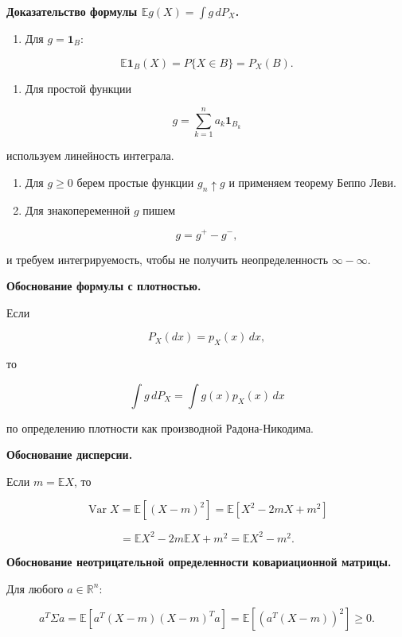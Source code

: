\documentclass[
  11pt,
  a4paper,
]{article}
\providecommand{\tightlist}{%
  \setlength{\itemsep}{0pt}\setlength{\parskip}{0pt}}
\begin{document}
\textbf{Доказательство формулы \(\mathbb E g(X)=\int g\,dP_X\).}

\begin{enumerate}
\def\labelenumi{\arabic{enumi}.}
\tightlist
\item
  Для \(g=\mathbf 1_B\):
\end{enumerate}

\[
\mathbb E\mathbf 1_B(X)=P\{X\in B\}=P_X(B).
\]

\begin{enumerate}
\def\labelenumi{\arabic{enumi}.}
\setcounter{enumi}{1}
\tightlist
\item
  Для простой функции
\end{enumerate}

\[
g=\sum_{k=1}^n a_k\mathbf 1_{B_k}
\]

используем линейность интеграла.

\begin{enumerate}
\def\labelenumi{\arabic{enumi}.}
\setcounter{enumi}{2}
\item
  Для \(g\ge0\) берем простые функции \(g_n\uparrow g\) и применяем
  теорему Беппо Леви.
\item
  Для знакопеременной \(g\) пишем
\end{enumerate}

\[
g=g^+-g^-,
\]

и требуем интегрируемость, чтобы не получить неопределенность
\(\infty-\infty\).

\textbf{Обоснование формулы с плотностью.}

Если

\[
P_X(dx)=p_X(x)\,dx,
\]

то

\[
\int g\,dP_X
=
\int g(x)p_X(x)\,dx
\]

по определению плотности как производной Радона-Никодима.

\textbf{Обоснование дисперсии.}

Если \(m=\mathbb EX\), то

\[
\operatorname{Var}X
=
\mathbb E[(X-m)^2]
=
\mathbb E[X^2-2mX+m^2]
\]

\[
=
\mathbb EX^2-2m\mathbb EX+m^2
=
\mathbb EX^2-m^2.
\]

\textbf{Обоснование неотрицательной определенности ковариационной
матрицы.}

Для любого \(a\in\mathbb R^n\):

\[
a^T\Sigma a
=
\mathbb E[a^T(X-m)(X-m)^Ta]
=
\mathbb E[(a^T(X-m))^2]
\ge0.
\]
\end{document}
